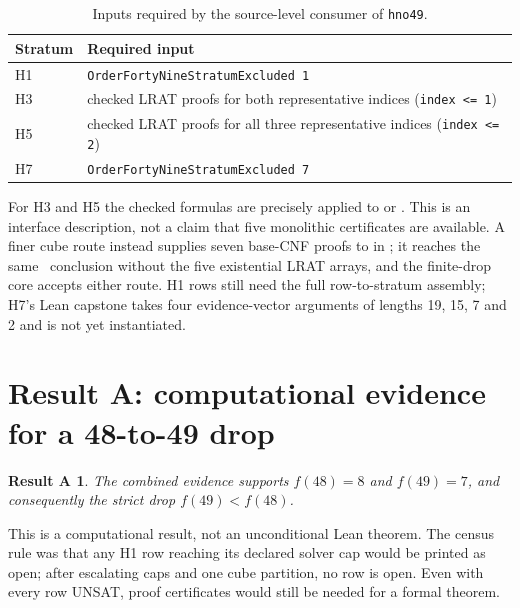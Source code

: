 \documentclass{anvil-paper}
\newcommand{\hnoFortyNine}{\lean{hno49}}
\newtheorem*{resultA}{Result A}
\theoremstyle{definition}
\begin{document}
\begin{table}[htbp]
\centering\small
\caption{Inputs required by the source-level consumer of \texttt{hno49}.}
\label{tab:inputs}
\begin{tabularx}{\textwidth}{@{}>{\raggedright\arraybackslash}p{}>{\raggedright\arraybackslash}X@{}}
\toprule
Stratum & Required input \\
\midrule
H1 & \texttt{OrderFortyNineStratumExcluded 1} \\
H3 & checked LRAT proofs for both representative indices (\texttt{index <= 1}) \\
H5 & checked LRAT proofs for all three representative indices (\texttt{index <= 2}) \\
H7 & \texttt{OrderFortyNineStratumExcluded 7} \\
\bottomrule
\end{tabularx}
\end{table}

For H3 and H5 the checked formulas are precisely  applied to  or . This is an interface description, not a claim that five monolithic certificates are available. A finer cube route instead supplies seven base-CNF  proofs to  in ; it reaches the same \hnoFortyNine\ conclusion without the five existential LRAT arrays, and the finite-drop core accepts either route. H1 rows still need the full row-to-stratum assembly; H7's Lean capstone  takes four evidence-vector arguments of lengths 19, 15, 7 and 2 and is not yet instantiated.

\section{Result A: computational evidence for a 48-to-49 drop}\label{sec:resultA}

\begin{resultA}
The combined evidence supports $f(48)=8$ and $f(49)=7$, and consequently the strict drop $f(49)<f(48)$.
\end{resultA}

This is a computational result, not an unconditional Lean theorem. The census rule was that any H1 row reaching its declared solver cap would be printed as open; after escalating caps and one cube partition, no row is open. Even with every row UNSAT, proof certificates would still be needed for a formal theorem.
\end{document}

